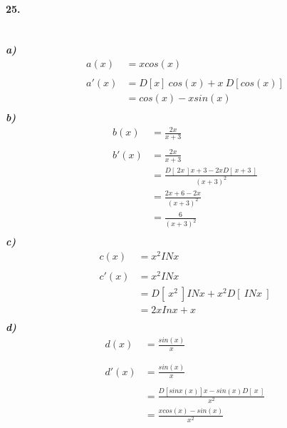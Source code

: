 \documentclass[12pt, a4paper]{article}
\begin{document}
    \paragraph*{25.}
        \textit{
            \\
            \textbf{a)}
        }
    \begin{equation*}
        \begin{split}
            a(x)&= x cos(x)\\\\
            a'(x)&= D[x]~cos(x) + x~D[cos(x)]\\
            &= cos(x) -xsin(x)\\
        \end{split}
    \end{equation*}
        \textit{
            \textbf{b)}
        }
        \begin{equation*}
            \begin{split}
                b(x)&=\frac{2x}{x+3}\\\\
                b'(x)&=\frac{2x}{x+3}\\
                &=\frac{D[~2x~]x+3 -2xD[~x+3~]}{(x+3)^2}\\
                &=\frac{2x+6 -2x}{(x+3)^2}\\
                &=\frac{6}{(x+3)^2}\\
            \end{split}
        \end{equation*}
        \textit{
            \textbf{c)}
        }
        \begin{equation*}
            \begin{split}
                c(x)&= x^2 IN x\\\\
                c'(x)&= x^2 IN x\\
                &=D[~x^2~] IN x + x^2 D[~IN x~]\\
                &=2xIn x + x\\
            \end{split}
        \end{equation*}
        \textit{
            \textbf{d)}
        }
        \begin{equation*}
            \begin{split}
                d(x)&= \frac{sin(x)}{x}\\\\\\
                d'(x)&= \frac{sin(x)}{x}\\\\
                &=\frac{D[sinx(x)] x -sin(x) D[~x~]}{x^2}\\
                &=\frac{xcos(x)-sin(x)}{x^2}\\
            \end{split}
        \end{equation*}
        \newpage
\end{document}
